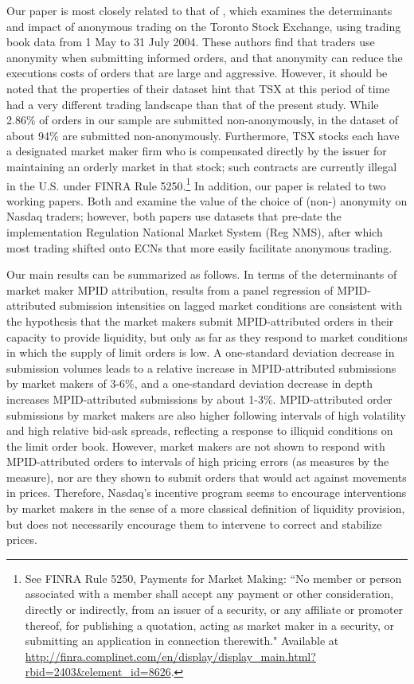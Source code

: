 \documentclass{article}
\begin{document}
\noindent Our paper is most closely related to that of \citet{comerton2011traders}, which examines the determinants and impact of anonymous trading on the Toronto Stock Exchange, using trading book data from 1 May to 31 July 2004. These authors find that traders use anonymity when submitting informed orders, and that anonymity can reduce the executions costs of orders that are large and aggressive. However, it should be noted that the properties of their dataset hint that TSX at this period of time had a very different trading landscape than that of the present study. While 2.86\% of orders in our sample are submitted non-anonymously, in the dataset of \citet{comerton2011traders} about 94\% are submitted non-anonymously. Furthermore, TSX stocks each have a designated market maker firm who is compensated directly by the issuer for maintaining an orderly market in that stock; such contracts are currently illegal in the U.S. under FINRA Rule 5250.\footnote{See FINRA Rule 5250, Payments for Market Making: ``No member or person associated with a member shall accept any payment or other consideration, directly or indirectly, from an issuer of a security, or any affiliate or promoter thereof, for publishing a quotation, acting as market maker in a security, or submitting an application in connection therewith." Available at \url{http://finra.complinet.com/en/display/display_main.html?rbid=2403&element_id=8626}.} In addition, our paper is related to two working papers. Both \citet{benhami2006liquidity} and \citet{karam2012} examine the value of the choice of (non-) anonymity on Nasdaq traders; however, both papers use datasets that pre-date the implementation Regulation National Market System (Reg NMS), after which most trading shifted onto ECNs that more easily facilitate anonymous trading.

\noindent Our main results can be summarized as follows. In terms of the determinants of market maker MPID attribution, results from a panel regression of MPID-attributed submission intensities on lagged market conditions are consistent with the hypothesis that the market makers submit MPID-attributed orders in their capacity to provide liquidity, but only as far as they respond to market conditions in which the supply of limit orders is low. A one-standard deviation decrease in submission volumes leads to a relative increase in MPID-attributed submissions by market makers of 3-6\%, and a one-standard deviation decrease in depth increases MPID-attributed submissions by about 1-3\%. MPID-attributed order submissions by market makers are also higher following intervals of high volatility and high relative bid-ask spreads, reflecting a response to illiquid conditions on the limit order book. However, market makers are not shown to respond with MPID-attributed orders to intervals of high pricing errors (as measures by the \citet{hasbrouck1993assessing} measure), nor are they shown to submit orders that would act against movements in prices. Therefore, Nasdaq's incentive program seems to encourage interventions by market makers in the sense of a more classical definition of liquidity provision, but does not necessarily encourage them to intervene to correct and stabilize prices.
\end{document}
